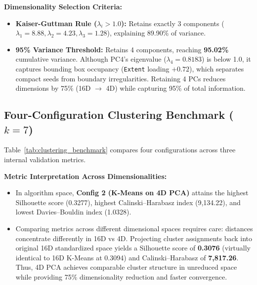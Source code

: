 \documentclass[9.5pt,twocolumn,letterpaper]{article}
\begin{document}
\textbf{Dimensionality Selection Criteria:}
\begin{itemize}
  \item \textbf{Kaiser-Guttman Rule ($\lambda_i > 1.0$):} Retains exactly 3 components ($\lambda_1=8.88, \lambda_2=4.23, \lambda_3=1.28$), explaining 89.90\% of variance.
  \item \textbf{95\% Variance Threshold:} Retains 4 components, reaching \textbf{95.02\%} cumulative variance. Although PC4's eigenvalue ($\lambda_4=0.8183$) is below 1.0, it captures bounding box occupancy (\texttt{Extent} loading $+0.72$), which separates compact seeds from boundary irregularities. Retaining 4 PCs reduces dimensions by 75\% (16D $\to$ 4D) while capturing 95\% of total information.
\end{itemize}

\subsection{Four-Configuration Clustering Benchmark ($k=7$)}
Table~\ref{tab:clustering_benchmark} compares four configurations across three internal validation metrics.

\textbf{Metric Interpretation Across Dimensionalities:}
\begin{itemize}
  \item In algorithm space, \textbf{Config 2 (K-Means on 4D PCA)} attains the highest Silhouette score (0.3277), highest Calinski--Harabasz index (9,134.22), and lowest Davies--Bouldin index (1.0328).
  \item Comparing metrics across different dimensional spaces requires care: distances concentrate differently in 16D vs 4D. Projecting cluster assignments back into original 16D standardized space yields a Silhouette score of \textbf{0.3076} (virtually identical to 16D K-Means at 0.3094) and Calinski--Harabasz of \textbf{7,817.26}. Thus, 4D PCA achieves comparable cluster structure in unreduced space while providing 75\% dimensionality reduction and faster convergence.
\end{itemize}
\end{document}
